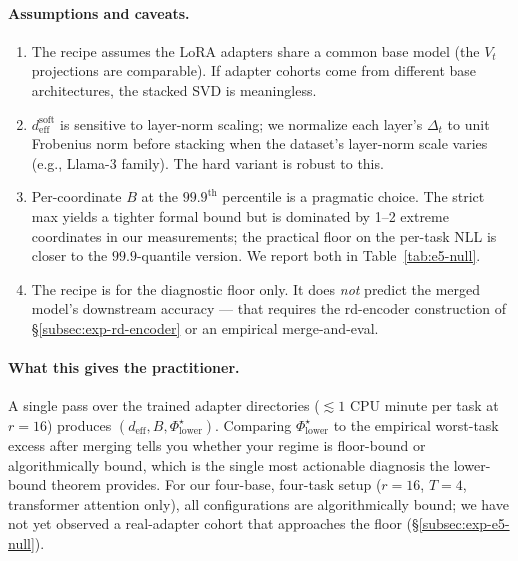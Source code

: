 \paragraph{Assumptions and caveats.}
\begin{enumerate}
\item The recipe assumes the LoRA adapters share a common base model
  (the $V_t$ projections are comparable). If adapter cohorts come from
  different base architectures, the stacked SVD is meaningless.
\item $d_{\mathrm{eff}}^{\mathrm{soft}}$ is sensitive to layer-norm
  scaling; we normalize each layer's $\Delta_t$ to unit Frobenius norm
  before stacking when the dataset's layer-norm scale varies (e.g.,
  Llama-3 family). The hard variant is robust to this.
\item Per-coordinate $B$ at the $99.9^{\mathrm{th}}$ percentile is a
  pragmatic choice. The strict max yields a tighter formal bound but
  is dominated by 1--2 extreme coordinates in our measurements; the
  practical floor on the per-task NLL is closer to the $99.9$-quantile
  version. We report both in
  Table~\ref{tab:e5-null}.
\item The recipe is for the diagnostic floor only. It does \emph{not}
  predict the merged model's downstream accuracy --- that requires
  the rd-encoder construction of \S\ref{subsec:exp-rd-encoder} or an
  empirical merge-and-eval.
\end{enumerate}

\paragraph{What this gives the practitioner.}
A single pass over the trained adapter directories ($\lesssim 1$ CPU
minute per task at $r = 16$) produces $(d_{\mathrm{eff}}, B,
\Phi^\star_{\mathrm{lower}})$. Comparing $\Phi^\star_{\mathrm{lower}}$
to the empirical worst-task excess after merging tells you whether
your regime is floor-bound or algorithmically bound, which is the
single most actionable diagnosis the lower-bound theorem provides.
For our four-base, four-task setup ($r = 16$, $T = 4$, transformer
attention only), all configurations are algorithmically bound; we
have not yet observed a real-adapter cohort that approaches the
floor (\S\ref{subsec:exp-e5-null}).

